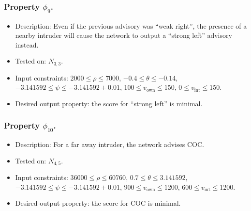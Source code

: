 \documentclass[a4paper]{llncs}
\begin{document}
\subsubsection{Property $\phi_9$.}
\begin{itemize}
\item Description:
Even if the previous advisory was ``weak right'',
the presence of a nearby intruder will cause the network to output a
 ``strong left'' advisory instead.
\item Tested on: $N_{3,3}$.
\item Input constraints:
    $2000 \leq \rho \leq 7000$,
    $-0.4 \leq \theta \leq -0.14$,
    $-3.141592 \leq \psi \leq -3.141592+0.01$,
    $100 \leq v_\text{own}\leq 150$,
    $0 \leq v_\text{int}\leq 150$.
\item Desired output property: the score for ``strong left'' is minimal.
\end{itemize}

\subsubsection{Property $\phi_{10}$.}
\begin{itemize}
\item Description:
For a far away intruder, the network advises COC.
\item Tested on: $N_{4,5}$.
\item Input constraints:
    $36000 \leq \rho \leq 60760$,
    $0.7 \leq \theta \leq 3.141592$,
    $-3.141592 \leq \psi \leq -3.141592+0.01$,
    $900 \leq v_\text{own}\leq 1200$,
    $600 \leq v_\text{int}\leq 1200$.
\item Desired output property: the score for COC is minimal.
\end{itemize}
\end{document}
